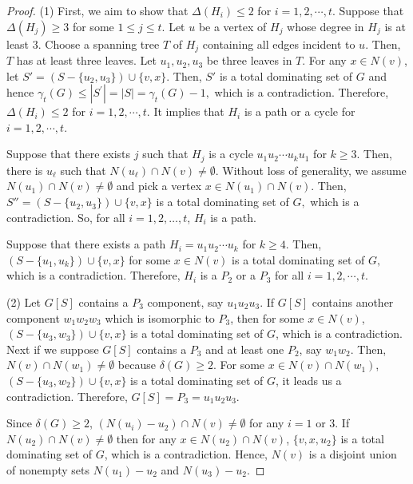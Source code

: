 \documentclass[12pt]{amsart}
\begin{document}
\begin{proof} (1) First, we aim to
show that $\Delta(H_i) \leq 2$ for $i=1,2,\cdots,t$. Suppose that
$\Delta(H_j) \geq 3$ for some $1\le j\le t$. Let $u$ be a
vertex of $H_j$ whose degree in $H_j$ is at least $3$. Choose a
spanning tree $T$ of $H_j$ containing all edges incident to $u$.
Then, $T$ has at least three leaves. Let $u_{1},u_{2},u_{3}$ be
three leaves in $T$. For any $x \in N(v)$, let
$S'=(S-\{u_{2},u_{3}\}) \cup \{v,x\}$. Then, $S'$ is a total
dominating set of $G$ and hence $\gamma_{t}(G) \leq
|S^{\prime}|=|S|=\gamma_{t}(G)-1,$ which is a contradiction.
Therefore, $\Delta(H_i) \leq 2$ for $i=1,2,\cdots,t$. It implies
that $H_i$ is a path or a cycle for $i=1,2,\cdots, t$.

Suppose that there exists $j$ such that $H_j$ is a cycle $u_{1}u_{2}\cdots
u_{k}u_1$ for $k \geq 3$. Then, there is $u_\ell$ such that
$N(u_\ell) \cap N(v) \neq \emptyset$. Without loss of generality,
we assume $N(u_1) \cap N(v) \neq \emptyset$ and pick a vertex $x \in
N(u_1) \cap N(v)$. Then, $S''=(S-\{u_{2},u_{3}\}) \cup \{v,x\}$ is
a total dominating set of $G,$ which is a contradiction. So, for
all $i = 1,2, \ldots, t$, $H_i$ is a path.

Suppose that there exists a path $H_i =u_{1}u_{2}\cdots u_{k}$ for
$k \geq 4$. Then, $(S-\{u_{1},u_{k}\}) \cup \{v,x\}$ for some $x
\in N(v)$ is a total dominating set of $G,$ which is a
contradiction. Therefore, $H_i$ is a $P_{2}$ or a $P_{3}$ for all
$i=1,2, \cdots,t$.

 \noindent (2) Let $G[S]$ contains a $P_{3}$
component, say $u_{1}u_{2}u_{3}$. If $G[S]$ contains another
component $w_{1}w_{2}w_{3}$ which is isomorphic to $P_{3}$, then for some $x \in N(v)$,
$(S-\{u_{3},w_{3}\}) \cup \{v,x\}$ is a total dominating set of
$G$, which is a contradiction. Next if we suppose $G[S]$ contains a $P_{3}$ and at least one $P_{2}$, say
$w_{1}w_{2}$. Then, $N(v) \cap N(w_1) \neq
\emptyset$ because $\delta(G) \ge 2$. For some $x \in N(v) \cap
N(w_1)$, $(S-\{u_{3},w_{2}\}) \cup \{v,x \}$ is a total dominating
set of $G$, it leads us a contradiction. Therefore, $G[S]=P_{3}=u_{1}u_{2}u_{3}$.

Since $\delta(G) \ge 2$, $(N(u_i)-u_2) \cap N(v) \neq \emptyset$
for any $i=1$ or $3$. If $N(u_2) \cap N(v) \neq \emptyset$ then
for any $x \in N(u_2) \cap N(v)$, $\{v , x , u_2 \}$ is a total
dominating set of $G$, which is a contradiction. Hence, $N(v)$ is
a disjoint union of nonempty sets $N(u_1)-u_2$ and
 $N(u_3)-u_2$.


\end{proof}
\end{document}
